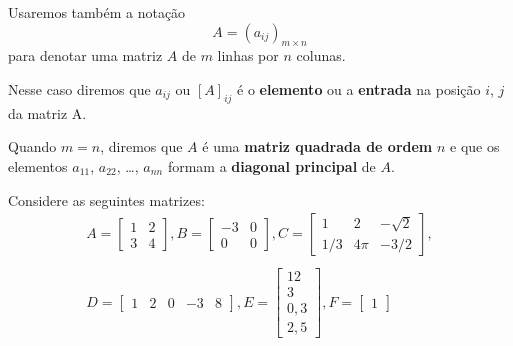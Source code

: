 \documentclass{beamer}
\begin{document}
    \begin{frame}
      Usaremos também a notação
      \[
        A = (a_{ij})_{m \times n}
      \]
      para denotar uma matriz $A$ de $m$ linhas por $n$ colunas. 

      Nesse caso diremos que $a_{ij}$ ou $[A]_{ij}$ é o \textbf{elemento} ou a \textbf{entrada} na posição $i$, $j$ da matriz A.

      Quando $m = n$, diremos que $A$ é uma \textbf{matriz quadrada de ordem} $n$ e que os elementos $a_{11}$, $a_{22}$, \dots, $a_{nn}$ 
      formam a \textbf{diagonal principal} de $A$.
    \end{frame}

    \begin{frame}
      \begin{exemplos}
        Considere as seguintes matrizes:
        \begin{eqnarray*}
          A = \begin{bmatrix}
            1 & 2\\
            3 & 4
          \end{bmatrix},
          B = \begin{bmatrix}
            -3 & 0\\
            0 & 0
          \end{bmatrix},
          C = \begin{bmatrix}
            1 & 2 & -\sqrt{2}\\
            1/3 & 4\pi & -3/2
          \end{bmatrix},\\\\
          D = \begin{bmatrix}
            1 & 2 & 0 & -3 & 8
          \end{bmatrix},
          E = \begin{bmatrix}
            12\\
            3\\
            0,3\\
            2,5
          \end{bmatrix},
          F = \begin{bmatrix}
            1
          \end{bmatrix}
        \end{eqnarray*} 
      \end{exemplos}
    \end{frame}
\end{document}
